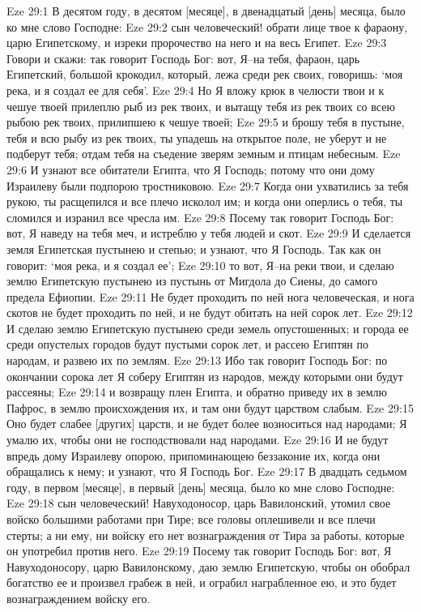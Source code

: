 Eze 29:1  В десятом году, в десятом [месяце], в двенадцатый [день] месяца, было ко мне слово Господне:
Eze 29:2  сын человеческий! обрати лице твое к фараону, царю Египетскому, и изреки пророчество на него и на весь Египет.
Eze 29:3  Говори и скажи: так говорит Господь Бог: вот, Я--на тебя, фараон, царь Египетский, большой крокодил, который, лежа среди рек своих, говоришь: `моя река, и я создал ее для себя'.
Eze 29:4  Но Я вложу крюк в челюсти твои и к чешуе твоей прилеплю рыб из рек твоих, и вытащу тебя из рек твоих со всею рыбою рек твоих, прилипшею к чешуе твоей;
Eze 29:5  и брошу тебя в пустыне, тебя и всю рыбу из рек твоих, ты упадешь на открытое поле, не уберут и не подберут тебя; отдам тебя на съедение зверям земным и птицам небесным.
Eze 29:6  И узнают все обитатели Египта, что Я Господь; потому что они дому Израилеву были подпорою тростниковою.
Eze 29:7  Когда они ухватились за тебя рукою, ты расщепился и все плечо исколол им; и когда они оперлись о тебя, ты сломился и изранил все чресла им.
Eze 29:8  Посему так говорит Господь Бог: вот, Я наведу на тебя меч, и истреблю у тебя людей и скот.
Eze 29:9  И сделается земля Египетская пустынею и степью; и узнают, что Я Господь. Так как он говорит: `моя река, и я создал ее';
Eze 29:10  то вот, Я--на реки твои, и сделаю землю Египетскую пустынею из пустынь от Мигдола до Сиены, до самого предела Ефиопии.
Eze 29:11  Не будет проходить по ней нога человеческая, и нога скотов не будет проходить по ней, и не будут обитать на ней сорок лет.
Eze 29:12  И сделаю землю Египетскую пустынею среди земель опустошенных; и города ее среди опустелых городов будут пустыми сорок лет, и рассею Египтян по народам, и развею их по землям.
Eze 29:13  Ибо так говорит Господь Бог: по окончании сорока лет Я соберу Египтян из народов, между которыми они будут рассеяны;
Eze 29:14  и возвращу плен Египта, и обратно приведу их в землю Пафрос, в землю происхождения их, и там они будут царством слабым.
Eze 29:15  Оно будет слабее [других] царств, и не будет более возноситься над народами; Я умалю их, чтобы они не господствовали над народами.
Eze 29:16  И не будут впредь дому Израилеву опорою, припоминающею беззаконие их, когда они обращались к нему; и узнают, что Я Господь Бог.
Eze 29:17  В двадцать седьмом году, в первом [месяце], в первый [день] месяца, было ко мне слово Господне:
Eze 29:18  сын человеческий! Навуходоносор, царь Вавилонский, утомил свое войско большими работами при Тире; все головы оплешивели и все плечи стерты; а ни ему, ни войску его нет вознаграждения от Тира за работы, которые он употребил против него.
Eze 29:19  Посему так говорит Господь Бог: вот, Я Навуходоносору, царю Вавилонскому, даю землю Египетскую, чтобы он обобрал богатство ее и произвел грабеж в ней, и ограбил награбленное ею, и это будет вознаграждением войску его.
